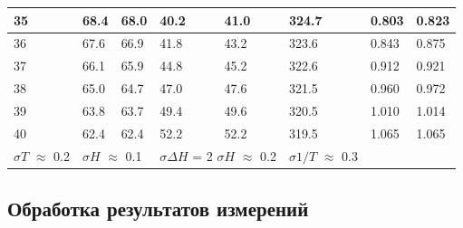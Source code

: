 \begin{table}[h!]
\begin{tabular}{|l|l|l|l|l|l|ll}
35                         & 68.4                   & 68.0                     & 40.2                              & 41.0                               & 324.7                      & \multicolumn{1}{l|}{0.803}                    & \multicolumn{1}{l|}{0.823}                      \\ \hline
36                         & 67.6                   & 66.9                     & 41.8                              & 43.2                               & 323.6                      & \multicolumn{1}{l|}{0.843}                    & \multicolumn{1}{l|}{0.875}                      \\ \hline
37                         & 66.1                   & 65.9                     & 44.8                              & 45.2                               & 322.6                      & \multicolumn{1}{l|}{0.912}                    & \multicolumn{1}{l|}{0.921}                      \\ \hline
38                         & 65.0                   & 64.7                     & 47.0                              & 47.6                               & 321.5                      & \multicolumn{1}{l|}{0.960}                    & \multicolumn{1}{l|}{0.972}                      \\ \hline
39                         & 63.8                   & 63.7                     & 49.4                              & 49.6                               & 320.5                      & \multicolumn{1}{l|}{1.010}                    & \multicolumn{1}{l|}{1.014}                      \\ \hline
40                         & 62.4                   & 62.4                     & 52.2                              & 52.2                               & 319.5                      & \multicolumn{1}{l|}{1.065}                    & \multicolumn{1}{l|}{1.065}                      \\ \hline
$\sigma T$ $\approx$ 0.2 & \multicolumn{2}{l|}{$\sigma H$ $\approx$ 0.1} & \multicolumn{2}{l|}{$\sigma \Delta H$ = 2 $\sigma H$ $\approx$ 0.2} & $\sigma 1/T$ $\approx$ 0.3 & \multicolumn{2}{l}{}                                                                            \\ \cline{1-6}
\end{tabular}
\end{table}
\subsection{Обработка результатов измерений}

